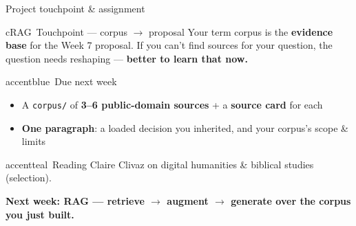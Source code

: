 \begin{frame}{Project touchpoint \& assignment}
  \begin{featbox}{cRAG}{\faProjectDiagram\ Touchpoint --- corpus $\to$ proposal}
    \small
    Your term corpus is the \textbf{evidence base} for the Week 7 proposal. If you can't
    find sources for your question, the question needs reshaping --- \textbf{better to
    learn that now.}
  \end{featbox}
  \vspace{4pt}
  \begin{featbox}{accentblue}{\faLaptopCode\ Due next week}
    \small
    \begin{itemize}\setlength{\itemsep}{1pt}
      \item A \texttt{corpus/} of \textbf{3--6 public-domain sources} + a \textbf{source card} for each
      \item \textbf{One paragraph}: a loaded decision you inherited, and your corpus's scope \& limits
    \end{itemize}
  \end{featbox}
  \vspace{4pt}
  \begin{featbox}{accentteal}{\faBookOpen\ Reading}
    \small Claire Clivaz on digital humanities \& biblical studies (selection).
  \end{featbox}
  \vspace{4pt}
  \begin{center}\small\color{labnavy}\bfseries
    Next week: \textbf{RAG} --- retrieve $\to$ augment $\to$ generate over the corpus you just built.\end{center}
\end{frame}


